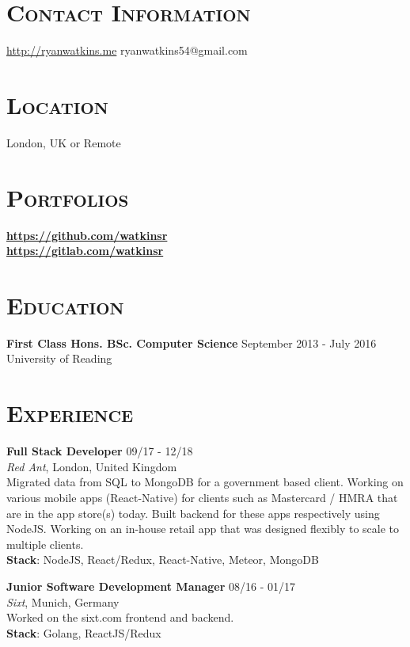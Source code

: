 \documentclass[line, margin, 10pt]{res}
\begin{document}
\renewcommand{\namefont}{ \LARGE \bf }


\begin{resume}

\section{\textsc{Contact Information}}
\url{http://ryanwatkins.me} \hfill {ryanwatkins54@gmail.com}\\

\section{\textsc{Location}}
London, UK or Remote

\section{\textsc{Portfolios}}
        {\bf \url{https://github.com/watkinsr}}\\
        {\hfill {\bf \url{https://gitlab.com/watkinsr}}}
        
\section{\textsc{Education}}
        
{\bf First Class Hons. BSc. Computer Science}  {\hfill September 2013 - July 2016}\\
University of Reading

\section{\textsc{Experience}}
{\bf Full Stack Developer} {\hfill 09/17 - 12/18}\\
{\it Red Ant}, London, United Kingdom \\
Migrated data from SQL to MongoDB for a government based client. Working on various mobile apps (React-Native) for clients such as Mastercard / HMRA that are in the app store(s) today. Built backend for these apps respectively using NodeJS. Working on an in-house retail app that was designed flexibly to scale to multiple clients.\\
{\bf Stack}: NodeJS, React/Redux, React-Native, Meteor, MongoDB

{\bf Junior Software Development Manager} {\hfill 08/16 - 01/17}\\
{\it Sixt}, Munich, Germany\\
Worked on the sixt.com frontend and backend.\\
{\bf Stack}: Golang, ReactJS/Redux


\end{resume}
\end{document}
